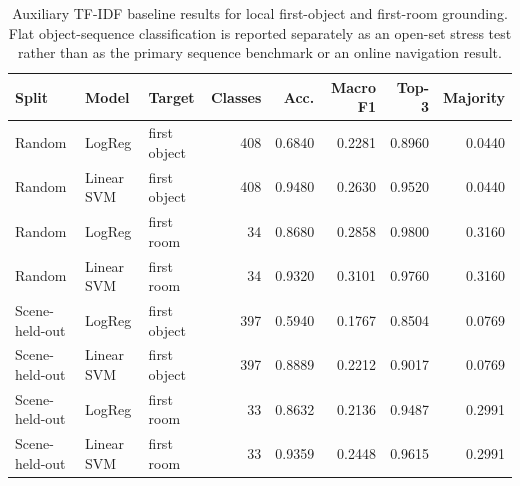 \begin{table}[pos=tbp]
\centering
\caption{Auxiliary TF-IDF baseline results for local first-object and first-room grounding. Flat object-sequence classification is reported separately as an open-set stress test rather than as the primary sequence benchmark or an online navigation result.}
\label{tab:classic_ml}
\setlength{\tabcolsep}{3.5pt}
\renewcommand{\arraystretch}{1.08}
\begin{tabular}{lllrrrrr}
\hline
Split & Model & Target & Classes & Acc. & Macro F1 & Top-3 & Majority \\
\hline
Random & LogReg & first object & 408 & 0.6840 & 0.2281 & 0.8960 & 0.0440 \\
Random & Linear SVM & first object & 408 & 0.9480 & 0.2630 & 0.9520 & 0.0440 \\
Random & LogReg & first room & 34 & 0.8680 & 0.2858 & 0.9800 & 0.3160 \\
Random & Linear SVM & first room & 34 & 0.9320 & 0.3101 & 0.9760 & 0.3160 \\
Scene-held-out & LogReg & first object & 397 & 0.5940 & 0.1767 & 0.8504 & 0.0769 \\
Scene-held-out & Linear SVM & first object & 397 & 0.8889 & 0.2212 & 0.9017 & 0.0769 \\
Scene-held-out & LogReg & first room & 33 & 0.8632 & 0.2136 & 0.9487 & 0.2991 \\
Scene-held-out & Linear SVM & first room & 33 & 0.9359 & 0.2448 & 0.9615 & 0.2991 \\
\hline
\end{tabular}
\end{table}
